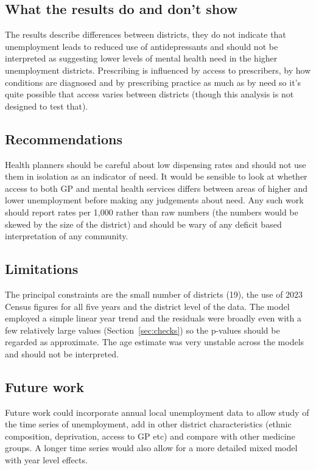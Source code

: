 \documentclass[11pt,a4paper]{article}
\begin{document}
\subsection{What the results do and don't show}
The results describe differences between districts, they do not indicate that unemployment leads to reduced use of antidepressants and should not be interpreted as suggesting lower levels of mental health need in the higher unemployment districts. Prescribing is influenced by access to prescribers, by how conditions are diagnosed and by prescribing practice as much as by need so it's quite possible that access varies between districts (though this analysis is not designed to test that).

\subsection{Recommendations}
Health planners should be careful about low dispensing rates and should not use them in isolation as an indicator of need. It would be sensible to look at whether access to both GP and mental health services differs between areas of higher and lower unemployment before making any judgements about need. Any such work should report rates per 1,000 rather than raw numbers (the numbers would be skewed by the size of the district) and should be wary of any deficit based interpretation of any community.

\subsection{Limitations}
The principal constraints are the small number of districts (19), the use of 2023 Census figures for all five years and the district level of the data. The model employed a simple linear year trend and the residuals were broadly even with a few relatively large values (Section~\ref{sec:checks}) so the p-values should be regarded as approximate. The age estimate was very unstable across the models and should not be interpreted.

\subsection{Future work}
Future work could incorporate annual local unemployment data to allow study of the time series of unemployment, add in other district characteristics (ethnic composition, deprivation, access to GP etc) and compare with other medicine groups. A longer time series would also allow for a more detailed mixed model with year level effects.
\end{document}
